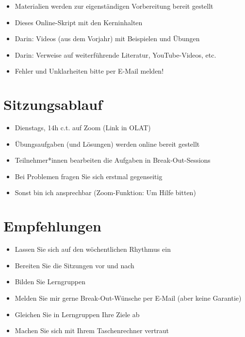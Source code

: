 \documentclass[
  11pt,
  ngerman,
  a4paper,
]{report}
\providecommand{\tightlist}{%
  \setlength{\itemsep}{0pt}\setlength{\parskip}{0pt}}
\begin{document}
\begin{itemize}
\tightlist
\item
  Materialien werden zur eigenständigen Vorbereitung bereit gestellt
\item
  Dieses Online-Skript mit den Kerninhalten
\item
  Darin: Videos (aus dem Vorjahr) mit Beispielen und Übungen
\item
  Darin: Verweise auf weiterführende Literatur, YouTube-Videos, etc.
\item
  Fehler und Unklarheiten bitte per E-Mail melden!
\end{itemize}

\hypertarget{sitzungsablauf}{%
\section*{Sitzungsablauf}\label{sitzungsablauf}}

\begin{itemize}
\tightlist
\item
  Dienstags, 14h c.t. auf Zoom (Link in OLAT)
\item
  Übungsaufgaben (und Lösungen) werden online bereit gestellt
\item
  Teilnehmer*innen bearbeiten die Aufgaben in Break-Out-Sessions
\item
  Bei Problemen fragen Sie sich erstmal gegenseitig
\item
  Sonst bin ich ansprechbar (Zoom-Funktion: Um Hilfe bitten)
\end{itemize}

\hypertarget{empfehlungen}{%
\section*{Empfehlungen}\label{empfehlungen}}

\begin{itemize}
\tightlist
\item
  Lassen Sie sich auf den wöchentlichen Rhythmus ein
\item
  Bereiten Sie die Sitzungen vor und nach
\item
  Bilden Sie Lerngruppen
\item
  Melden Sie mir gerne Break-Out-Wünsche per E-Mail (aber keine Garantie)
\item
  Gleichen Sie in Lerngruppen Ihre Ziele ab
\item
  Machen Sie sich mit Ihrem Taschenrechner vertraut
\end{itemize}
\end{document}

